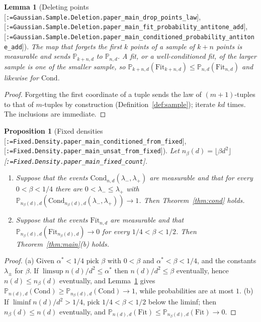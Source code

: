\documentclass[11pt]{article}
\makeatletter
\newcommand{\formal@break}[1]{\@tfor\formal@tok:=#1\do{%
  \formal@tok
  \expandafter\ifx\formal@tok.\allowbreak\else
  \expandafter\ifx\formal@tok\_\allowbreak\fi\fi}}
\DeclareRobustCommand{\formal}[1]{\textnormal{[\texttt{\small\formal@break{#1}}]}}
\newcommand{\Prob}{\mathbb{P}}
\newcommand{\Fit}{\mathrm{Fit}}
\newcommand{\Cond}{\mathrm{Cond}}
\theoremstyle{plain}
\newtheorem{proposition}[theorem]{Proposition}
\newtheorem{lemma}[theorem]{Lemma}
\theoremstyle{definition}
\makeatother
\begin{document}
\begin{lemma}[Deleting points \formal{Gaussian.Sample.Deletion.paper\_main\_drop\_points\_law}, \formal{Gaussian.Sample.Deletion.paper\_main\_fit\_probability\_antitone\_add}, \formal{Gaussian.Sample.Deletion.paper\_main\_conditioned\_probability\_antitone\_add}]\label{lem:drop}
The map that forgets the first $k$ points of a sample of $k + n$ points is
measurable and sends $\Prob_{k+n,d}$ to $\Prob_{n,d}$. A fit, or a
well-conditioned fit, of the larger sample is one of the smaller sample,
so $\Prob_{k+n,d}(\Fit_{k+n,d}) \le \Prob_{n,d}(\Fit_{n,d})$ and likewise for
$\Cond$.
\end{lemma}

\begin{proof}
Forgetting the first coordinate of a tuple sends the law of $(m+1)$-tuples
to that of $m$-tuples by construction (Definition~\ref{def:sample});
iterate $kd$ times. The inclusions are immediate.
\end{proof}

\begin{proposition}[Fixed densities \formal{Fixed.Density.paper\_main\_conditioned\_from\_fixed}, \formal{Fixed.Density.paper\_main\_unsat\_from\_fixed}]\label{prop:fixed}
Let $n_\beta(d) = \lfloor\beta d^2\rfloor$ \formal{Fixed.Density.paper\_main\_fixed\_count}.
\begin{enumerate}
\item[(a)] Suppose that the events $\Cond_{n,d}(\lambda_-,\lambda_+)$ are
measurable and that for every $0 < \beta < 1/4$ there are
$0 < \lambda_- \le \lambda_+$ with $\Prob_{n_\beta(d),d}(\Cond_{n_\beta(d),d}(\lambda_-,\lambda_+)) \to 1$.
Then Theorem~\ref{thm:cond} holds.
\item[(b)] Suppose that the events $\Fit_{n,d}$ are measurable and that
$\Prob_{n_\beta(d),d}(\Fit_{n_\beta(d),d}) \to 0$ for every $1/4 < \beta < 1/2$.
Then Theorem~\ref{thm:main}(b) holds.
\end{enumerate}
\end{proposition}

\begin{proof}
(a) Given $\alpha^* < 1/4$ pick $\beta$ with $0 < \beta$ and
$\alpha^* < \beta < 1/4$, and the constants $\lambda_\pm$ for $\beta$. If
$\limsup n(d)/d^2 \le \alpha^*$ then $n(d)/d^2 \le \beta$ eventually, hence
$n(d) \le n_\beta(d)$ eventually, and Lemma~\ref{lem:drop} gives
$\Prob_{n(d),d}(\Cond) \ge \Prob_{n_\beta(d),d}(\Cond) \to 1$, while
probabilities are at most $1$. (b) If $\liminf n(d)/d^2 > 1/4$, pick
$1/4 < \beta < 1/2$ below the liminf; then $n_\beta(d) \le n(d)$ eventually,
and $\Prob_{n(d),d}(\Fit) \le \Prob_{n_\beta(d),d}(\Fit) \to 0$.
\end{proof}
\end{document}
